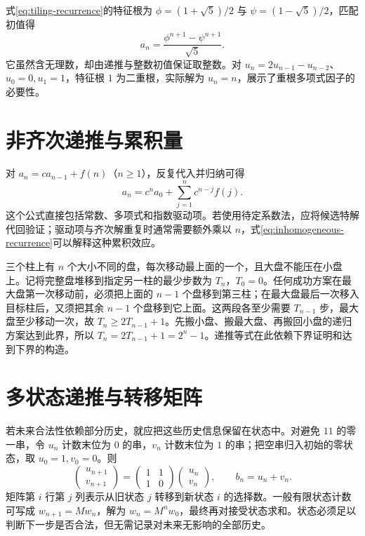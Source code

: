 \begin{example}
式\eqref{eq:tiling-recurrence}的特征根为 $\phi=(1+\sqrt5)/2$ 与 $\psi=(1-\sqrt5)/2$，匹配初值得
\[
  a_n=\frac{\phi^{n+1}-\psi^{n+1}}{\sqrt5}.
\]
它虽然含无理数，却由递推与整数初值保证取整数。对 $u_n=2u_{n-1}-u_{n-2}$、$u_0=0,u_1=1$，特征根 $1$ 为二重根，实际解为 $u_n=n$，展示了重根多项式因子的必要性。
\end{example}

\section{非齐次递推与累积量}

对 $a_n=ca_{n-1}+f(n)$（$n\ge1$），反复代入并归纳可得
\begin{equation}
  a_n=c^na_0+\sum_{j=1}^n c^{n-j}f(j).
  \label{eq:inhomogeneous-recurrence}
\end{equation}
这个公式直接包括常数、多项式和指数驱动项。若使用待定系数法，应将候选特解代回验证；驱动项与齐次解重复时通常需要额外乘以 $n$，式\eqref{eq:inhomogeneous-recurrence}可以解释这种累积效应。

\begin{example}
三个柱上有 $n$ 个大小不同的盘，每次移动最上面的一个，且大盘不能压在小盘上。记将完整盘堆移到指定另一柱的最少步数为 $T_n$，$T_0=0$。任何成功方案在最大盘第一次移动前，必须把上面的 $n-1$ 个盘移到第三柱；在最大盘最后一次移入目标柱后，又须把其余 $n-1$ 个盘移到它上面。这两段各至少需要 $T_{n-1}$ 步，最大盘至少移动一次，故 $T_n\ge2T_{n-1}+1$。先搬小盘、搬最大盘、再搬回小盘的递归方案达到此界，所以 $T_n=2T_{n-1}+1=2^n-1$。递推等式在此依赖下界证明和达到下界的构造。
\end{example}

\section{多状态递推与转移矩阵}

若未来合法性依赖部分历史，就应把这些历史信息保留在状态中。对避免 $11$ 的零一串，令 $u_n$ 计数末位为 $0$ 的串，$v_n$ 计数末位为 $1$ 的串；把空串归入初始的零状态，取 $u_0=1,v_0=0$。则
\[
 \begin{pmatrix}u_{n+1}\\v_{n+1}\end{pmatrix}
 =\begin{pmatrix}1&1\\1&0\end{pmatrix}
  \begin{pmatrix}u_n\\v_n\end{pmatrix},\qquad b_n=u_n+v_n.
\]
矩阵第 $i$ 行第 $j$ 列表示从旧状态 $j$ 转移到新状态 $i$ 的选择数。一般有限状态计数可写成 $w_{n+1}=Mw_n$，解为 $w_n=M^nw_0$，最终再对接受状态求和。状态必须足以判断下一步是否合法，但无需记录对未来无影响的全部历史。


